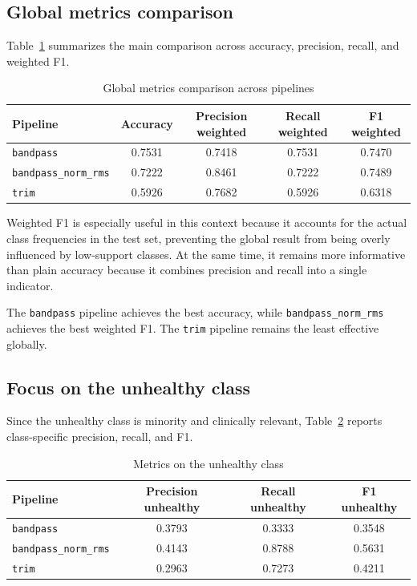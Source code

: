 \documentclass[12pt,a4paper]{article}
\begin{document}
\subsection*{Global metrics comparison}
Table~\ref{tab:metriche-globali} summarizes the main comparison across accuracy, precision,
recall, and weighted F1.

\begin{table}[htbp]
    \centering
    \caption{Global metrics comparison across pipelines}
    \label{tab:metriche-globali}
    \begin{tabular}{|l|c|c|c|c|}
        \hline
        \textbf{Pipeline} & \textbf{Accuracy} & \textbf{Precision weighted} & \textbf{Recall weighted} & \textbf{F1 weighted} \\
        \hline
        \texttt{bandpass} & 0.7531 & 0.7418 & 0.7531 & 0.7470 \\
        \hline
        \texttt{bandpass\_norm\_rms} & 0.7222 & 0.8461 & 0.7222 & 0.7489 \\
        \hline
        \texttt{trim} & 0.5926 & 0.7682 & 0.5926 & 0.6318 \\
        \hline
    \end{tabular}
\end{table}

Weighted F1 is especially useful in this context because it accounts for the actual class
frequencies in the test set, preventing the global result from being overly influenced by
low-support classes. At the same time, it remains more informative than plain accuracy
because it combines precision and recall into a single indicator.

The \texttt{bandpass} pipeline achieves the best accuracy, while
\texttt{bandpass\_norm\_rms} achieves the best weighted F1. The \texttt{trim} pipeline
remains the least effective globally.

\subsection*{Focus on the unhealthy class}
Since the unhealthy class is minority and clinically relevant,
Table~\ref{tab:metriche-unhealthy} reports class-specific precision, recall, and F1.

\begin{table}[htbp]
    \centering
    \caption{Metrics on the unhealthy class}
    \label{tab:metriche-unhealthy}
    \begin{tabular}{|l|c|c|c|}
        \hline
        \textbf{Pipeline} & \textbf{Precision unhealthy} & \textbf{Recall unhealthy} & \textbf{F1 unhealthy} \\
        \hline
        \texttt{bandpass} & 0.3793 & 0.3333 & 0.3548 \\
        \hline
        \texttt{bandpass\_norm\_rms} & 0.4143 & 0.8788 & 0.5631 \\
        \hline
        \texttt{trim} & 0.2963 & 0.7273 & 0.4211 \\
        \hline
    \end{tabular}
\end{table}
\end{document}
